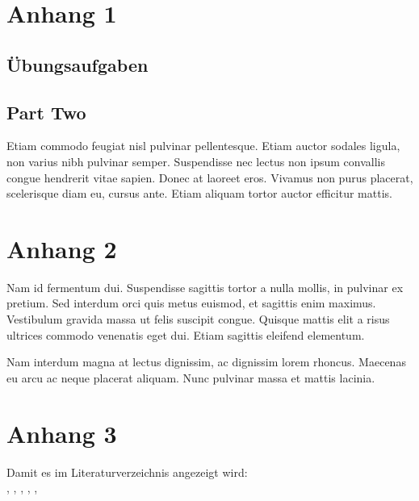 \documentclass[acmtog]{acmart}
\begin{document}



\appendix

\section{Anhang 1}

\subsection{Übungsaufgaben}

\subsection{Part Two}

Etiam commodo feugiat nisl pulvinar pellentesque. Etiam auctor sodales
ligula, non varius nibh pulvinar semper. Suspendisse nec lectus non
ipsum convallis congue hendrerit vitae sapien. Donec at laoreet
eros. Vivamus non purus placerat, scelerisque diam eu, cursus
ante. Etiam aliquam tortor auctor efficitur mattis.

\section{Anhang 2}

Nam id fermentum dui. Suspendisse sagittis tortor a nulla mollis, in
pulvinar ex pretium. Sed interdum orci quis metus euismod, et sagittis
enim maximus. Vestibulum gravida massa ut felis suscipit
congue. Quisque mattis elit a risus ultrices commodo venenatis eget
dui. Etiam sagittis eleifend elementum.

Nam interdum magna at lectus dignissim, ac dignissim lorem
rhoncus. Maecenas eu arcu ac neque placerat aliquam. Nunc pulvinar
massa et mattis lacinia.

\section{Anhang 3}

Damit es im Literaturverzeichnis angezeigt wird:\\
\cite{erbert08}, \cite{sommerville16}, \cite{balzert09}, \cite{wiegers13},
\cite{pohl15}, \cite{martin13}
\end{document}
